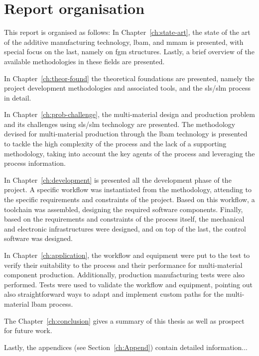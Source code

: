 %
\section{Report organisation}
This report is organised as follows:
In Chapter~\ref{ch:state-art}, the state of the art of the additive
manufacturing technology, \gls{lbam}, and \gls{mmam} is presented, with special
focus on the last, namely on \gls{fgm} structures. Lastly, a brief overview of
the available methodologies in these fields are presented.

In Chapter~\ref{ch:theor-found} the theoretical foundations are presented, namely the project development methodologies and associated tools,
and the \gls{sls}/\gls{slm} process in detail.

In Chapter~\ref{ch:prob-challenge}, the multi-material design and production
problem and its challenges using \gls{sls}/\gls{slm} technology are
presented. The methodology devised for multi-material production through the
\gls{lbam} technology is presented to tackle the high complexity of the process
and the lack of a supporting methodology, taking into account the key agents of
the process and leveraging the process information.

In Chapter~\ref{ch:development} is presented all the development phase of the
project. A specific workflow was instantiated from
the methodology, attending to the specific requirements and constraints of the
project. Based on this workflow, a toolchain was assembled, designing the
required software components. Finally, based on the requirements and constraints
of the process itself, the mechanical and electronic infrastructures were
designed, and on top of the last, the control software was designed.

In Chapter~\ref{ch:application}, the workflow and equipment were put to the test
to verify their suitability to the process and their performance for
multi-material component production. Additionally, production manufacturing tests
were also performed. Tests were used to validate the workflow and equipment,
pointing out also straightforward ways to adapt and implement custom paths for
the multi-material \gls{lbam} process.

The Chapter~\ref{ch:conclusion} gives a summary of this thesis as well as
prospect for future work.

Lastly, the appendices (see Section~\ref{ch:Append}) contain detailed information...
